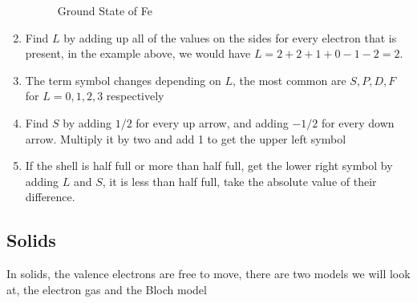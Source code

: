 \begin{enumerate}
\begin{figure}[H]
    \caption{Ground State of Fe}
  \end{figure}
\item Find $L$ by adding up all of the values on the sides for every electron that is present, in the example above, we would have $L=2+2+1+0-1-2=2$. 
\item The term symbol changes depending on $L$, the most common are $S,P,D,F$ for $L=0,1,2,3$ respectively
\item Find $S$ by adding $1/2$ for every up arrow, and adding $-1/2$ for every down arrow. Multiply it by two and add 1 to get the upper left symbol
\item If the shell is half full or more than half full, get the lower right symbol by adding $L$ and $S$, it is less than half full, take the absolute value of their difference. 
\end{enumerate}
\subsection{Solids}
In solids, the valence electrons are free to move, there are two models we will look at, the electron gas and the Bloch model
